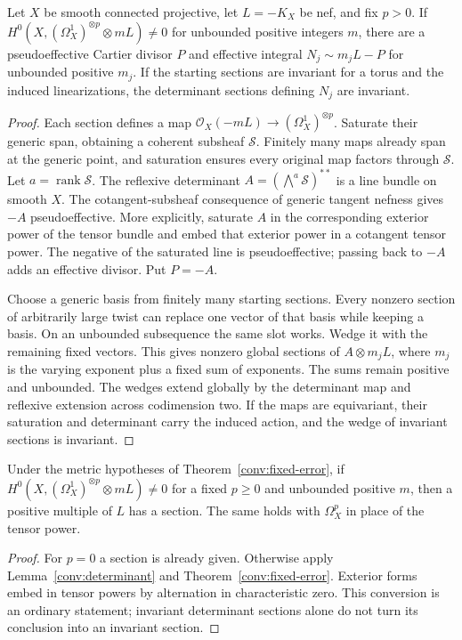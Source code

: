 \begin{lemma}\label{conv:determinant}
Let $X$ be smooth connected projective, let $L=-K_X$ be nef, and fix
$p>0$.  If
$H^0(X,(\Omega_X^1)^{\otimes p}\otimes mL)\ne0$ for unbounded
positive integers $m$, there are a pseudoeffective Cartier divisor $P$
and effective integral $N_j\sim m_jL-P$ for unbounded positive $m_j$.
If the starting sections are invariant for a torus and the induced
linearizations, the determinant sections defining $N_j$ are invariant.
\end{lemma}
\begin{proof}
Each section defines a map $\mathcal O_X(-mL)\to
(\Omega_X^1)^{\otimes p}$.  Saturate their generic span, obtaining a
coherent subsheaf $\mathcal S$.  Finitely many maps already span at
the generic point, and saturation ensures every original map factors
through $\mathcal S$.  Let $a=\operatorname{rank}\mathcal S$.
The reflexive determinant $A=(\bigwedge^a\mathcal S)^{**}$ is a line
bundle on smooth $X$.
The cotangent-subsheaf consequence of generic tangent nefness
\cite[Theorem~4.1]{LMPTX2023} gives $-A$ pseudoeffective.
More explicitly, saturate $A$ in the corresponding exterior power of
the tensor bundle and embed that exterior power in a cotangent tensor
power.  The negative of the saturated line is pseudoeffective; passing
back to $-A$ adds an effective divisor.  Put $P=-A$.

Choose a generic basis from finitely many starting sections.  Every
nonzero section of arbitrarily large twist can replace one vector of
that basis while keeping a basis.  On an unbounded subsequence the same
slot works.  Wedge it with the remaining fixed vectors.  This gives
nonzero global sections of $A\otimes m_jL$, where $m_j$ is the
varying exponent plus a fixed sum of exponents.  The sums remain
positive and unbounded.  The wedges extend globally by the determinant
map and reflexive extension across codimension two.
If the maps are equivariant, their saturation and determinant carry
the induced action, and the wedge of invariant sections is invariant.
\end{proof}

\begin{corollary}\label{conv:tensor-conversion}
Under the metric hypotheses of Theorem~\ref{conv:fixed-error}, if
$H^0(X,(\Omega_X^1)^{\otimes p}\otimes mL)\ne0$ for a fixed
$p\ge0$ and unbounded positive $m$, then a positive multiple of $L$
has a section.  The same holds with $\Omega_X^p$ in place of the
tensor power.
\end{corollary}
\begin{proof}
For $p=0$ a section is already given.  Otherwise apply
Lemma~\ref{conv:determinant} and Theorem~\ref{conv:fixed-error}.
Exterior forms embed in tensor powers by alternation in characteristic
zero.  This conversion is an ordinary statement; invariant determinant
sections alone do not turn its conclusion into an invariant section.
\end{proof}

